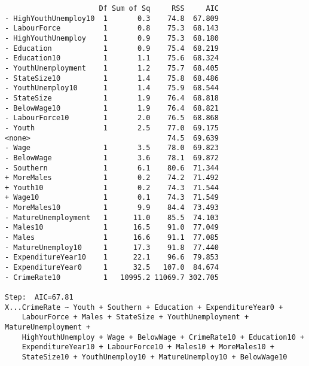 \documentclass[11pt]{article}
\begin{document}
\begin{enumerate}
\begin{verbatim}
                      Df Sum of Sq     RSS     AIC
- HighYouthUnemploy10  1       0.3    74.8  67.809
- LabourForce          1       0.8    75.3  68.143
- HighYouthUnemploy    1       0.9    75.3  68.180
- Education            1       0.9    75.4  68.219
- Education10          1       1.1    75.6  68.324
- YouthUnemployment    1       1.2    75.7  68.405
- StateSize10          1       1.4    75.8  68.486
- YouthUnemploy10      1       1.4    75.9  68.544
- StateSize            1       1.9    76.4  68.818
- BelowWage10          1       1.9    76.4  68.821
- LabourForce10        1       2.0    76.5  68.868
- Youth                1       2.5    77.0  69.175
<none>                                74.5  69.639
- Wage                 1       3.5    78.0  69.823
- BelowWage            1       3.6    78.1  69.872
- Southern             1       6.1    80.6  71.344
+ MoreMales            1       0.2    74.2  71.492
+ Youth10              1       0.2    74.3  71.544
+ Wage10               1       0.1    74.3  71.549
- MoreMales10          1       9.9    84.4  73.493
- MatureUnemployment   1      11.0    85.5  74.103
- Males10              1      16.5    91.0  77.049
- Males                1      16.6    91.1  77.085
- MatureUnemploy10     1      17.3    91.8  77.440
- ExpenditureYear10    1      22.1    96.6  79.853
- ExpenditureYear0     1      32.5   107.0  84.674
- CrimeRate10          1   10995.2 11069.7 302.705

Step:  AIC=67.81
X...CrimeRate ~ Youth + Southern + Education + ExpenditureYear0 + 
    LabourForce + Males + StateSize + YouthUnemployment + MatureUnemployment + 
    HighYouthUnemploy + Wage + BelowWage + CrimeRate10 + Education10 + 
    ExpenditureYear10 + LabourForce10 + Males10 + MoreMales10 + 
    StateSize10 + YouthUnemploy10 + MatureUnemploy10 + BelowWage10


\end{verbatim}
\end{enumerate}
\end{document}
